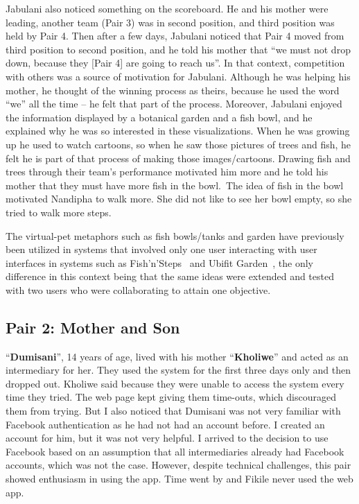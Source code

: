 Jabulani also noticed something on the scoreboard. He and his mother were leading, another team (Pair 3) was in second position, and third position was held by Pair 4. Then after a few days, Jabulani noticed that Pair 4 moved from third position to second position, and he told his mother that ``we must not drop down, because they [Pair 4] are going to reach us''. In that context, competition with others was a source of motivation for Jabulani. Although he was helping his mother, he thought of the winning process as theirs, because he used the word “we” all the time -- he felt that part of the process. Moreover, Jabulani enjoyed the information displayed by a botanical garden and a fish bowl, and he explained why he was so interested in these visualizations. When he was growing up he used to watch cartoons, so when he saw those pictures of trees and fish, he felt he is part of that process of making those images/cartoons. Drawing fish and trees through their team's performance motivated him more and he told his mother that they must have more fish in the bowl.~The idea of fish in the bowl motivated Nandipha to walk more. She did not like to see her bowl empty, so she tried to walk more steps. 

The virtual-pet metaphors such as fish bowls/tanks and garden have previously been utilized in systems that involved only one user interacting with user interfaces in systems such as Fish'n'Steps~\citep{lin2006:fish} and Ubifit Garden~\citep{klasnja2009:using}, the only difference in this context being that the same ideas were extended and tested with two users who were collaborating to attain one objective.
\subsection*{\textbf{Pair 2: Mother and Son}}
``\textbf{Dumisani}'', 14 years of age, lived with his mother ``\textbf{Kholiwe}'' and acted as an intermediary for her. They used the system for the first three days only and then dropped out. Kholiwe said because they were unable to access the system every time they tried. The web page kept giving them time-outs, which discouraged them from trying. But I also noticed that Dumisani was not very familiar with Facebook authentication as he had not had an account before. I created an account for him, but it was not very helpful. I arrived to the decision to use Facebook based on an assumption that all intermediaries already had Facebook accounts, which was not the case. However, despite technical challenges, this pair showed enthusiasm in using the app. Time went by and Fikile never used the web app.
